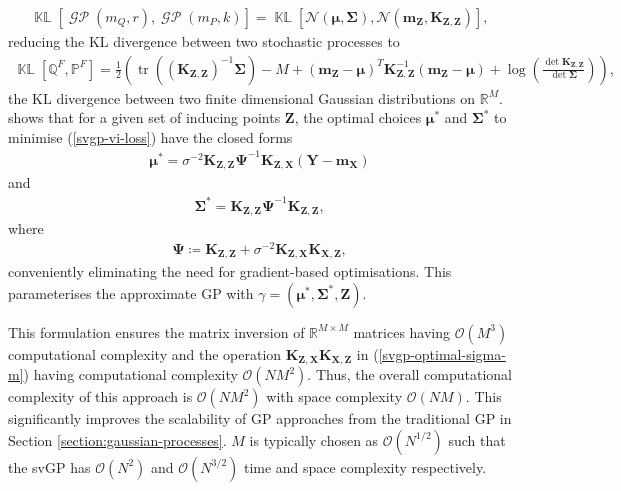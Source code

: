 \documentclass{article}
\newcommand{\KLD}{\operatorname{\mathbb{KL}}}
\newcommand{\tr}{\operatorname{tr}}
\newcommand{\GP}{\operatorname{\mathcal{GP}}}
\numberwithin{equation}{section}
\begin{document}
\begin{align}
    \KLD\left[\GP\left(m_Q, r\right), \GP\left(m_P, k\right)\right] = \KLD\left[\mathcal{N}\left(\boldsymbol{\mu}, \mathbf{\Sigma}\right), \mathcal{N}\left(\mathbf{m}_{\mathbf{Z}}, \mathbf{K}_{\mathbf{Z}, \mathbf{Z}}\right)\right],
\end{align}
reducing the KL divergence between two stochastic processes to
\begin{align}
        \KLD\left[\mathbb{Q}^F, \mathbb{P}^F\right]
    = \frac{1}{2}\left( \tr\left(\left(\mathbf{K}_{\mathbf{Z}, \mathbf{Z}}\right)^{-1} \boldsymbol{\Sigma}\right) - M +
    \left(\mathbf{m}_{\mathbf{Z}} - \boldsymbol{\mu}\right)^T \mathbf{K}_{\mathbf{Z}, \mathbf{Z}}^{-1} \left(\mathbf{m}_{\mathbf{Z}} - \boldsymbol{\mu}\right)+ \log\left(\frac{\det\mathbf{K}_{\mathbf{Z}, \mathbf{Z}}}{\det\boldsymbol{\Sigma}}\right) \right),
    \label{kld-closed-form}
\end{align}
the KL divergence between two finite dimensional Gaussian distributions on $\mathbb{R}^M$.
\cite{titsias2009variational} shows that for a given set of inducing points $\mathbf{Z}$, the optimal choices $\boldsymbol{\mu}^*$ and $\mathbf{\Sigma}^*$ to minimise (\ref{svgp-vi-loss}) have the closed forms
\begin{align}
    \label{svgp-optimal-mean}
    \boldsymbol{\mu}^* = \sigma^{-2}\mathbf{K}_{\mathbf{Z}, \mathbf{Z}} \mathbf{\Psi}^{-1}\mathbf{K}_{\mathbf{Z}, \mathbf{X}}  \left(\mathbf{Y} - \mathbf{m}_\mathbf{X}\right)
\end{align}
and
\begin{align}
    \label{svgp-optimal-covariance}
    \mathbf{\Sigma}^* = \mathbf{K}_{\mathbf{Z}, \mathbf{Z}}  \mathbf{\Psi}^{-1}\mathbf{K}_{\mathbf{Z}, \mathbf{Z}},
\end{align}
where
\begin{align}
    \mathbf{\Psi} \coloneqq \mathbf{K}_{\mathbf{Z}, \mathbf{Z}}  + \sigma^{-2}\mathbf{K}_{\mathbf{Z}, \mathbf{X}} \mathbf{K}_{\mathbf{X}, \mathbf{Z}},
    \label{svgp-optimal-sigma-m}
\end{align}
conveniently eliminating the need for gradient-based optimisations.
This parameterises the approximate GP with $\gamma = \left(\boldsymbol{\mu}^*, \mathbf{\Sigma}^*,  \mathbf{Z}\right)$.

This formulation ensures the matrix inversion of $\mathbb{R}^{M \times M}$ matrices having $\mathcal{O}\left(M^3\right)$ computational complexity and the operation $\mathbf{K}_{\mathbf{Z}, \mathbf{X}} \mathbf{K}_{\mathbf{X}, \mathbf{Z}}$ in (\ref{svgp-optimal-sigma-m}) having computational complexity $\mathcal{O}\left(NM^2\right)$.
Thus, the overall computational complexity of this approach is $\mathcal{O}\left(NM^2\right)$ with space complexity $\mathcal{O}\left(NM\right)$.
This significantly improves the scalability of GP approaches from the traditional GP in Section \ref{section:gaussian-processes}. $M$ is typically chosen as $\mathcal{O}(N^{1/2})$ such that the svGP has $\mathcal{O}(N^{2})$ and $\mathcal{O}(N^{3/2})$ time and space complexity respectively.
\end{document}
